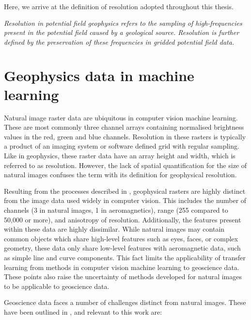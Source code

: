 \documentclass[manuscript.tex]{subfiles}
\begin{document}
Here, we arrive at the definition of resolution adopted throughout this thesis.

\emph{Resolution in potential field geophysics refers to the sampling of high-frequencies present in the potential field caused by a geological source.
    Resolution is further defined by the preservation of these frequencies in gridded potential field data.}

%

\section{Geophysics data in machine learning}
\label{sec:introdata}
Natural image raster data are ubiquitous in computer vision machine learning.
These are most commonly three channel arrays containing normalised brightness values in the red, green and blue channels.
Resolution in these rasters is typically a product of an imaging system or software defined grid with regular sampling.
Like in geophysics, these raster data have an array height and width, which is referred to as resolution.
However, the lack of spatial quantification for the size of natural images confuses the term with its definition for geophysical resolution.

Resulting from the processes described in , geophysical rasters are highly distinct from the image data used widely in computer vision.
This includes the number of channels (3 in natural images, 1 in aeromagnetics), range (255 compared to 50,000 or more), and anisotropy of resolution.
Additionally, the features present within these data are highly dissimilar.
While natural images may contain common objects which share high-level features such as eyes, faces, or complex geometry, these data only share low-level features with aeromagnetic data, such as simple line and curve components.
This fact limits the applicability of transfer learning from methods in computer vision machine learning \parencite{tanSurveyDeepTransfer2018} to geoscience data.
These points also raise the uncertainty of methods developed for natural images to be  applicable to geoscience data.

Geoscience data faces a number of challenges distinct from natural images. These have been outlined in \textcite{karpatneMachineLearningGeosciences2019}, and relevant to this work are:
\end{document}
